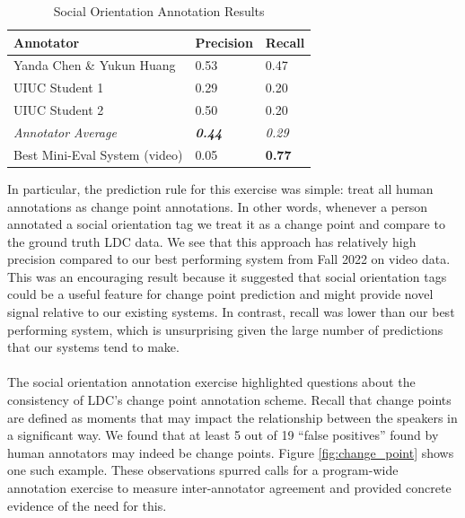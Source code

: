 \documentclass[12pt]{article}
\begin{document}
\begin{table}[H]
    \centering
    \begin{tabular}{lll}
    \toprule
    Annotator & Precision & Recall \\
    \midrule
    Yanda Chen \& Yukun Huang & 0.53 & 0.47 \\
    UIUC Student 1 & 0.29 & 0.20 \\
    UIUC Student 2 & 0.50 & 0.20 \\
    \textit{Annotator Average} & \textit{\textbf{0.44}} & \textit{0.29} \\
    \midrule
    Best Mini-Eval System (video) & 0.05 & \textbf{0.77} \\
    \bottomrule
    \end{tabular}
    \caption{Social Orientation Annotation Results}
    \label{tab:social_orientation_annotation_results}
\end{table}

In particular, the prediction rule for this exercise was simple: treat all human annotations as change point annotations. In other words, whenever a person annotated a social orientation tag we treat it as a change point and compare to the ground truth LDC data. We see that this approach has relatively high precision compared to our best performing system from Fall 2022 on video data. This was an encouraging result because it suggested that social orientation tags could be a useful feature for change point prediction and might provide novel signal relative to our existing systems. In contrast, recall was lower than our best performing system, which is unsurprising given the large number of predictions that our systems tend to make.\\
\\
The social orientation annotation exercise highlighted questions about the consistency of LDC's change point annotation scheme. Recall that change points are defined as moments that may impact the relationship between the speakers in a significant way. We found that at least 5 out of 19 ``false positives'' found by human annotators may indeed be change points. Figure \ref{fig:change_point} shows one such example. These observations spurred calls for a program-wide annotation exercise to measure inter-annotator agreement and provided concrete evidence of the need for this.
\end{document}
